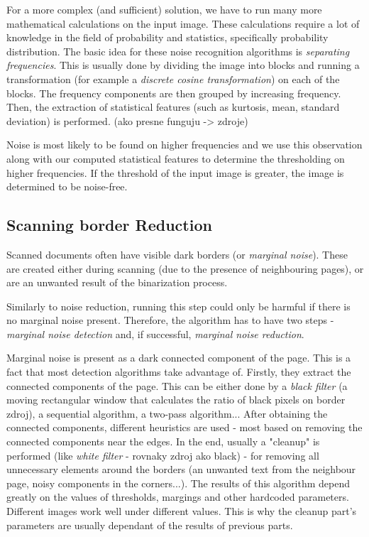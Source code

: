 For a more complex (and sufficient) solution, we have to run many more mathematical calculations on the input image. These calculations require a lot of knowledge in the field of probability and statistics, specifically probability distribution. The basic idea for these noise recognition algorithms is \emph{separating frequencies}. This is usually done by dividing the image into blocks and running a transformation (for example a \emph{discrete cosine transformation}) on each of the blocks. The frequency components are then grouped by increasing frequency. Then, the extraction of statistical features (such as kurtosis, mean, standard deviation) is performed. (ako presne funguju -> zdroje)

Noise is most likely to be found on higher frequencies and we use this observation along with our computed statistical features to determine the thresholding on higher frequencies. If the threshold of the input image is greater, the image is determined to be noise-free. 

\subsection{Scanning border Reduction}

Scanned documents often have visible dark borders (or \emph{marginal noise}). These are created either during scanning (due to the presence of neighbouring pages), or are an unwanted result of the binarization process.

Similarly to noise reduction, running this step could only be harmful if there is no marginal noise present. Therefore, the algorithm has to have two steps - \emph{marginal noise detection} and, if successful, \emph{marginal noise reduction}.

Marginal noise is present as a dark connected component of the page. This is a fact that most detection algorithms take advantage of. Firstly, they extract the connected components of the page. This can be either done  by a \emph{black filter} (a moving rectangular window that calculates the ratio of black pixels on border zdroj), a sequential algorithm, a two-pass algorithm... After obtaining the connected components, different heuristics are used - most based on removing the connected components near the edges. In the end, usually a "cleanup" is performed (like \emph{white filter} - rovnaky zdroj ako black) - for removing all unnecessary elements around the borders (an unwanted text from the neighbour page, noisy components in the corners...).
The results of this algorithm depend greatly on the values of thresholds, margings and other hardcoded parameters. Different images work well under different values. This is why the cleanup part's parameters are usually dependant of the results of previous parts.

